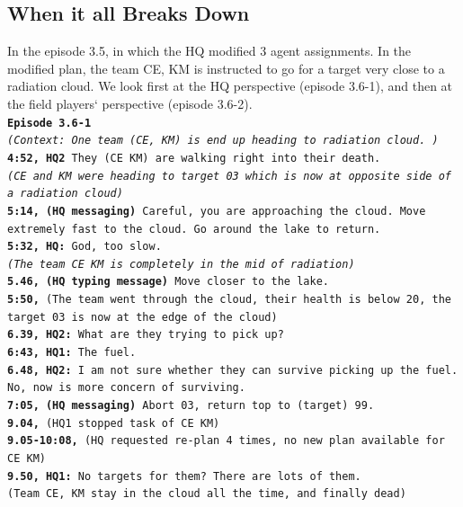 \subsection{When it all Breaks Down} \label{sec:playerDeath}
In the episode 3.5, in which the HQ modified 3 agent assignments. In the modified plan, the team CE, KM is instructed to go for a target very close to a radiation cloud. We look first at the HQ perspective (episode 3.6-1), and then at the field players` perspective (episode 3.6-2).\\

\noindent\texttt{\textbf{Episode 3.6-1}\\
\emph{(Context: One team (CE, KM) is end up heading to radiation cloud. )}\\
\textbf{4:52, HQ2 } They (CE KM) are walking right into their death. \\
\emph{(CE and KM were heading to target 03 which is now at opposite side of a radiation cloud)}\\
\textbf{5:14, (HQ messaging) } Careful, you are approaching the cloud. Move extremely fast to the cloud. Go around the lake to return.\\
\textbf{5:32, HQ: } God, too slow.\\
\emph{(The team CE KM is completely in the mid of radiation)}\\
\textbf{5.46, (HQ typing message) } Move closer to the lake.\\
\textbf{5:50, } (The team went through the cloud, their health is below 20, the target 03 is now at the edge of the cloud)\\
\textbf{6.39, HQ2: } What are they trying to pick up?\\
\textbf{6:43, HQ1: } The fuel.\\
\textbf{6.48, HQ2: } I am not sure whether they can survive picking up the fuel. No, now is more concern of surviving. \\
\textbf{7:05, (HQ messaging) } Abort 03, return top to (target) 99. \\
\textbf{9.04, } (HQ1 stopped task of CE KM) \\
\textbf{9.05-10:08, } (HQ requested re-plan 4 times, no new plan available for CE KM) \\
\textbf{9.50, HQ1: } No targets for them? There are lots of them. \\
(Team CE, KM stay in the cloud all the time, and finally dead)\\
}

